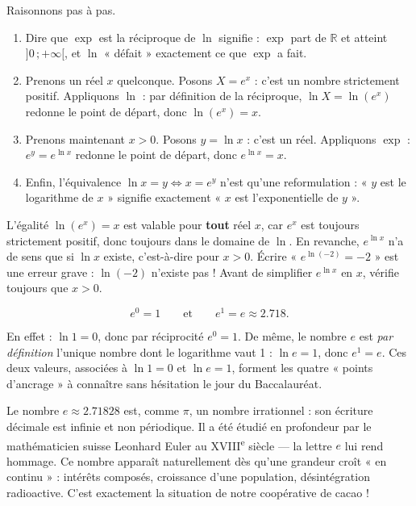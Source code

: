 \documentclass[11pt]{article}
\newcommand{\cle}[1]{{\popxbold\color{popdark}#1}}
\newcounter{popsec}
\newcounter{popsub}
\newcommand{\courssub}[1]{%
  \stepcounter{popsub}%
  \par\vspace{9pt}\noindent{\popxbold\fontsize{11.5}{13}\selectfont\color{popink}{\color{poporange}\thepopsec.\thepopsub}\hspace{6pt}#1}\par\nopagebreak\vspace{4pt}
}
\begin{document}
\begin{experience}
Raisonnons pas à pas.
\begin{enumerate}
\item Dire que $\exp$ est la réciproque de $\ln$ signifie : $\exp$ part de $\mathbb{R}$ et atteint $]0\,;+\infty[$, et $\ln$ « défait » exactement ce que $\exp$ a fait.
\item Prenons un réel $x$ quelconque. Posons $X=e^{x}$ : c'est un nombre strictement positif. Appliquons $\ln$ : par définition de la réciproque, $\ln X=\ln(e^{x})$ redonne le point de départ, donc $\ln(e^{x})=x$.
\item Prenons maintenant $x>0$. Posons $y=\ln x$ : c'est un réel. Appliquons $\exp$ : $e^{y}=e^{\ln x}$ redonne le point de départ, donc $e^{\ln x}=x$.
\item Enfin, l'équivalence $\ln x = y \iff x=e^{y}$ n'est qu'une reformulation : « $y$ est le logarithme de $x$ » signifie exactement « $x$ est l'exponentielle de $y$ ».
\end{enumerate}
\end{experience}

\begin{attention}
L'égalité $\ln(e^{x})=x$ est valable pour \textbf{tout} réel $x$, car $e^{x}$ est toujours strictement positif, donc toujours dans le domaine de $\ln$. En revanche, $e^{\ln x}$ n'a de sens que si $\ln x$ existe, c'est-à-dire pour $x>0$. Écrire « $e^{\ln(-2)}=-2$ » est une erreur grave : $\ln(-2)$ n'existe pas ! Avant de simplifier $e^{\ln x}$ en $x$, vérifie toujours que $x>0$.
\end{attention}

\courssub{Valeurs remarquables}

\begin{propriete}
\[ e^{0}=1 \qquad\text{et}\qquad e^{1}=e\approx \num{2,718}. \]
\end{propriete}

En effet : $\ln 1 = 0$, donc par réciprocité $e^{0}=1$. De même, le nombre $e$ est \emph{par définition} l'unique nombre dont le logarithme vaut 1 : $\ln e = 1$, donc $e^{1}=e$. Ces deux valeurs, associées à $\ln 1 = 0$ et $\ln e = 1$, forment les quatre « points d'ancrage » à connaître sans hésitation le jour du Baccalauréat.

\begin{savaistu}
Le nombre $e\approx \num{2,71828}$ est, comme $\pi$, un nombre \cle{irrationnel} : son écriture décimale est infinie et non périodique. Il a été étudié en profondeur par le mathématicien suisse Leonhard Euler au XVIII\textsuperscript{e} siècle — la lettre $e$ lui rend hommage. Ce nombre apparaît naturellement dès qu'une grandeur croît « en continu » : intérêts composés, croissance d'une population, désintégration radioactive. C'est exactement la situation de notre coopérative de cacao !
\end{savaistu}
\end{document}
